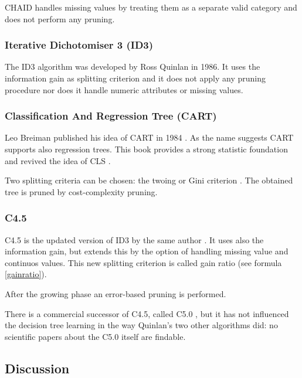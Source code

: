 CHAID handles missing values by treating them as a separate valid category and does not perform any pruning. 


\subsubsection{Iterative Dichotomiser 3 (ID3)} 

The ID3 algorithm was developed by Ross Quinlan in 1986. It uses the information gain as splitting criterion and it does not apply any pruning procedure nor does it handle numeric attributes or missing values.


\subsubsection{Classification And Regression Tree (CART)} 

Leo Breiman published his idea of CART in 1984 \cite{quinlandecisiontreediscovery}. As the name suggests CART supports also regression trees. This book provides a strong statistic foundation and revived the idea of CLS \cite[p. 435]{duda2012pattern}.

Two splitting criteria can be chosen: the twoing or Gini criterion \cite[p. 1]{shih1999families}. The obtained tree is pruned by cost-complexity pruning.  


\subsubsection{C4.5}

C4.5 is the updated version of ID3 by the same author \cite{Kohavi99decisiontree}. It uses also the information gain, but extends this by the option of handling missing value and continuos values. This new splitting criterion is called gain ratio (see formula \ref{gainratio}).

After the growing phase an error-based pruning is performed.



\begin{remark}
    There is a commercial successor of C4.5, called C5.0 \cite{Kohavi99decisiontree}, but it has not influenced the decision tree learning in the way Quinlan's two other algorithms did: no scientific papers about the C5.0 itself are findable. 
\end{remark}






\subsection{Discussion}


